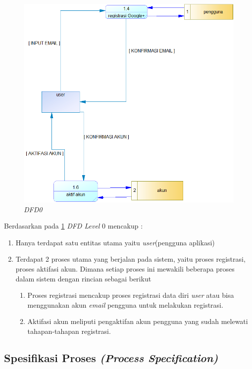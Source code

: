 \begin{figure}[!htbp]
    \centering
    \includegraphics[scale=0.6]{gambar/dfd0.png}
    \caption{\textit{DFD0}}
    \label{dfd0}
\end{figure}
\par
Berdasarkan pada \ref{dfd0} \textit{DFD Level} 0 mencakup :
\begin{enumerate}
    \item Hanya terdapat satu entitas utama yaitu \textit{user}(pengguna aplikasi)
    \item Terdapat 2 proses utama yang berjalan pada sistem, yaitu proses registrasi, proses aktifasi akun. Dimana setiap proses ini mewakili beberapa proses dalam sistem dengan rincian sebagai berikut 
    \begin{enumerate}
        \item Proses registrasi mencakup proses registrasi data diri \textit{user} atau bisa menggunakan akun \textit{email} pengguna untuk melakukan registrasi.
        \item Aktifasi akun meliputi pengaktifan akun pengguna yang sudah melewati tahapan-tahapan registrasi.
    \end{enumerate}
\end{enumerate}

\subsection{Spesifikasi Proses \textit{(Process Specification)}}
